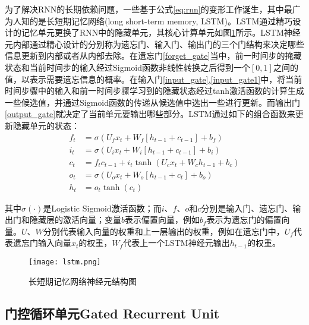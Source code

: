 为了解决RNN的长期依赖问题，一些基于公式\ref{eq:rnn}的变形工作诞生，其中最广为人知的是长短期记忆网络(long short-term memory, LSTM)。LSTM通过精巧设计的记忆单元更换了RNN中的隐藏单元，其核心计算单元如图\ref{fig:lstm}所示。LSTM神经元内部通过精心设计的分别称为遗忘门、输⼊门、输出门的三个门结构来决定哪些信息更新到内部或者从内部去除。在遗忘门\eqref{forget_gate}当中，前一时间步的掩藏状态和当前时间步的输入经过Sigmoid函数非线性转换之后得到一个$[0,1]$之间的值，以表示需要遗忘信息的概率。在输入门\eqref{input_gate},\eqref{input_gate1}中，将当前时间步骤中的输入和前一时间步骤学习到的隐藏状态经过tanh激活函数的计算生成一些候选值，并通过Sigmoid函数的传递从候选值中选出一些进行更新。而输出门\eqref{output_gate}就决定了当前单元要输出哪些部分。LSTM通过如下的组合函数来更新隐藏单元的状态：
  \begin{align} 
  f_{t} &=\sigma(U_{f} x_{t}+W_{f}[h_{t-1}+ c_{t-1}] +b_{f}) \label{forget_gate}\\
  i_{t} &=\sigma(U_{i} x_{t}+W_{i}[h_{t-1}+ c_{t-1}]+b_{i}) \label{input_gate}\\  
  c_{t} &=f_{t} c_{t-1}+i_{t} \tanh (U_{c} x_{t}+W_{c} h_{t-1}+b_{c}) \label{input_gate1}\\ 
  o_{t} &=\sigma(U_{o} x_{t}+W_{o}[h_{t-1}+ c_{t}]+b_{o}) \label{output_gate}\\ 
  h_{t} &=o_{t} \tanh (c_{t}) 
  \end{align}

其中$\sigma(\cdot)$是Logistic Sigmoid激活函数；而$i$、$f$、$o$和$c$分别是输入门、遗忘门、输出门和隐藏层的激活向量；变量$b$表示偏置向量，例如$b_{f}$表示为遗忘门的偏置向量。$U$、$W$分别代表输入向量的权重和上一层输出的权重，例如在遗忘门中，$U_{f}$代表遗忘门输入向量$x_{t}$的权重，$W_{f}$代表上一个LSTM神经元输出$h_{t-1}$的权重。

\begin{figure}[htb]
  \centering
  \texttt{[image: lstm.png]}\\
  \caption{长短期记忆网络神经元结构图}
  \label{fig:lstm}
\end{figure}

\subsection{门控循环单元Gated Recurrent Unit}

